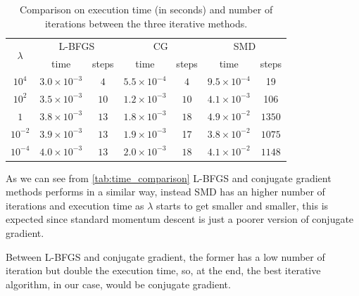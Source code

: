 \begin{table}[H]
\centering
\begin{tabular}{c|c|c|c|c|c|c} \hline \hline
    \multirow{2}{*}{$\lambda$} & \multicolumn{2}{c|}{L-BFGS} & \multicolumn{2}{c|}{CG} & \multicolumn{2}{c}{SMD} \\ \cline{2-7}
    & time & steps & time & steps & time & steps \\ \hline \hline
    
    \rowcolor{gray!30} $10^4$ & $3.0\times10^{-3}$ & $4$ & $5.5\times 10^{-4}$ & $4$ & $9.5 \times 10^{-4}$ & 19 \\
    
    $10^2$ & $3.5\times10^{-3}$ & $10$ & $1.2\times 10^{-3}$ & $10$ & $4.1 \times 10^{-3}$ & 106 \\
    
    \rowcolor{gray!30} $1$ & $3.8\times10^{-3}$ & $13$ & $1.8\times 10^{-3}$ & $18$ & $4.9 \times 10^{-2}$ & $1350$ \\
    
    $10^{-2}$ & $3.9\times10^{-3}$ & $13$ & $1.9\times 10^{-3}$ & 17 & $3.8 \times 10^{-2}$ & $1075$ \\
    
    \rowcolor{gray!30} $10^{-4}$ & $4.0\times10^{-3}$ & $13$ & $2.0\times 10^{-3}$ & $18$ & $4.1 \times 10^{-2}$ & $1148$ \\
    \hline \hline
\end{tabular}
\caption{Comparison on execution time (in seconds) and number of iterations between the three iterative methods.}
\label{tab:time_comparison}
\end{table}

\noindent As we can see from \autoref{tab:time_comparison} L-BFGS and conjugate gradient methods performs in a similar way, instead SMD has an higher number of iterations and execution time as $\lambda$ starts to get smaller and smaller, this is expected since standard momentum descent is just a poorer version of conjugate gradient.
\vspace{3mm}

\noindent Between L-BFGS and conjugate gradient, the former has a low number of iteration but double the execution time, so, at the end, the best iterative algorithm, in our case, would be conjugate gradient.

